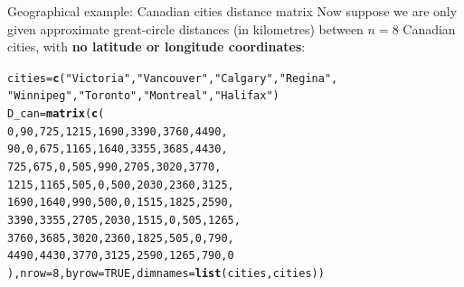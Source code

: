 \documentclass[aspectratio=169]{beamer}\usepackage[]{graphicx}\usepackage[]{xcolor}
\makeatletter
\newcommand{\hlnum}[1]{\textcolor[rgb]{0.686,0.059,0.569}{#1}}%
\newcommand{\hlsng}[1]{\textcolor[rgb]{0.192,0.494,0.8}{#1}}%
\newcommand{\hldef}[1]{\textcolor[rgb]{0.345,0.345,0.345}{#1}}%
\newcommand{\hlkwb}[1]{\textcolor[rgb]{0.69,0.353,0.396}{#1}}%
\newcommand{\hlkwc}[1]{\textcolor[rgb]{0.333,0.667,0.333}{#1}}%
\newcommand{\hlkwd}[1]{\textcolor[rgb]{0.737,0.353,0.396}{\textbf{#1}}}%
\newenvironment{kframe}{%
 \def\at@end@of@kframe{}%
 \ifinner\ifhmode%
  \def\at@end@of@kframe{\end{minipage}}%
  \begin{minipage}{\columnwidth}%
 \fi\fi%
 \def\FrameCommand##1{\hskip\@totalleftmargin \hskip-\fboxsep
 \colorbox{shadecolor}{##1}\hskip-\fboxsep
     \hskip-\linewidth \hskip-\@totalleftmargin \hskip\columnwidth}%
 \MakeFramed {\advance\hsize-\width
   \@totalleftmargin\z@ \linewidth\hsize
   \@setminipage}}%
 {\par\unskip\endMakeFramed%
 \at@end@of@kframe}
\newenvironment{knitrout}{}{} %
\makeatother
\begin{document}
\begin{frame}[fragile]{Geographical example: Canadian cities distance matrix}
Now suppose we are only given approximate great-circle distances (in kilometres) between $n = 8$ Canadian cities, with \textbf{no latitude or longitude coordinates}:
\vfill
\begin{knitrout}
\color{fgcolor}\begin{kframe}
\begin{alltt}
\hldef{cities} \hlkwb{=} \hlkwd{c}\hldef{(}\hlsng{"Victoria"}\hldef{,} \hlsng{"Vancouver"}\hldef{,} \hlsng{"Calgary"}\hldef{,} \hlsng{"Regina"}\hldef{,}
           \hlsng{"Winnipeg"}\hldef{,} \hlsng{"Toronto"}\hldef{,} \hlsng{"Montreal"}\hldef{,} \hlsng{"Halifax"}\hldef{)}
\hldef{D_can} \hlkwb{=} \hlkwd{matrix}\hldef{(}\hlkwd{c}\hldef{(}
     \hlnum{0}\hldef{,}   \hlnum{90}\hldef{,}  \hlnum{725}\hldef{,} \hlnum{1215}\hldef{,} \hlnum{1690}\hldef{,} \hlnum{3390}\hldef{,} \hlnum{3760}\hldef{,} \hlnum{4490}\hldef{,}
    \hlnum{90}\hldef{,}    \hlnum{0}\hldef{,}  \hlnum{675}\hldef{,} \hlnum{1165}\hldef{,} \hlnum{1640}\hldef{,} \hlnum{3355}\hldef{,} \hlnum{3685}\hldef{,} \hlnum{4430}\hldef{,}
   \hlnum{725}\hldef{,}  \hlnum{675}\hldef{,}    \hlnum{0}\hldef{,}  \hlnum{505}\hldef{,}  \hlnum{990}\hldef{,} \hlnum{2705}\hldef{,} \hlnum{3020}\hldef{,} \hlnum{3770}\hldef{,}
  \hlnum{1215}\hldef{,} \hlnum{1165}\hldef{,}  \hlnum{505}\hldef{,}    \hlnum{0}\hldef{,}  \hlnum{500}\hldef{,} \hlnum{2030}\hldef{,} \hlnum{2360}\hldef{,} \hlnum{3125}\hldef{,}
  \hlnum{1690}\hldef{,} \hlnum{1640}\hldef{,}  \hlnum{990}\hldef{,}  \hlnum{500}\hldef{,}    \hlnum{0}\hldef{,} \hlnum{1515}\hldef{,} \hlnum{1825}\hldef{,} \hlnum{2590}\hldef{,}
  \hlnum{3390}\hldef{,} \hlnum{3355}\hldef{,} \hlnum{2705}\hldef{,} \hlnum{2030}\hldef{,} \hlnum{1515}\hldef{,}    \hlnum{0}\hldef{,}  \hlnum{505}\hldef{,} \hlnum{1265}\hldef{,}
  \hlnum{3760}\hldef{,} \hlnum{3685}\hldef{,} \hlnum{3020}\hldef{,} \hlnum{2360}\hldef{,} \hlnum{1825}\hldef{,}  \hlnum{505}\hldef{,}    \hlnum{0}\hldef{,}  \hlnum{790}\hldef{,}
  \hlnum{4490}\hldef{,} \hlnum{4430}\hldef{,} \hlnum{3770}\hldef{,} \hlnum{3125}\hldef{,} \hlnum{2590}\hldef{,} \hlnum{1265}\hldef{,}  \hlnum{790}\hldef{,}    \hlnum{0}
\hldef{),} \hlkwc{nrow} \hldef{=} \hlnum{8}\hldef{,} \hlkwc{byrow} \hldef{=} \hlnum{TRUE}\hldef{,} \hlkwc{dimnames} \hldef{=} \hlkwd{list}\hldef{(cities, cities))}
\end{alltt}
\end{kframe}
\end{knitrout}
\end{frame}
\end{document}
